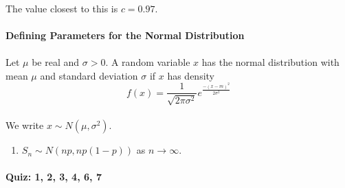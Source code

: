 \documentclass[letterpaper,12pt]{article}
\begin{document}
\paragraph{}The value closest to this is $c = 0.97$.

\paragraph{Defining Parameters for the Normal Distribution}
\paragraph{}Let $\mu$ be real and $\sigma > 0$. A random variable $x$ has the normal distribution
with mean $\mu$ and standard deviation $\sigma$ if $x$ has density
\[
    f(x) = \frac{1}{\sqrt{2\pi\sigma^2}}e^{\frac{-(x-m)^2}{2\sigma^2}}
\]
\paragraph{}We write $x \sim N(\mu, \sigma^2)$.
\begin{enumerate}
    \item $S_n \sim N(np, np(1-p))$ as $n \to \infty$.
\end{enumerate}
\paragraph{Quiz: 1, 2, 3, 4, 6, 7}
\end{document}
